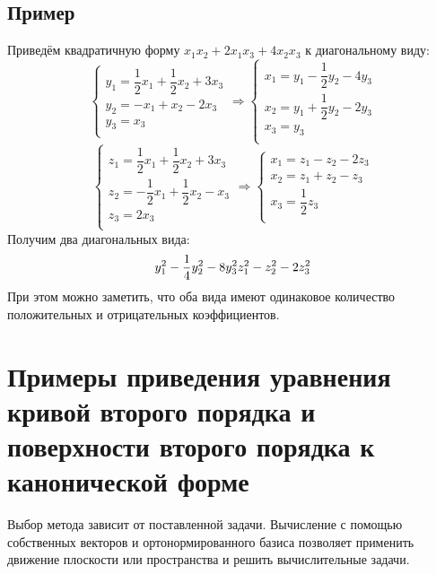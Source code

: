 \documentclass[12pt]{article}
\begin{document}
\subsection{Пример}
Приведём квадратичную форму $x_1x_2 + 2x_1x_3 + 4x_2x_3$ к диагональному виду:
\[
    \begin{cases}
        y_1 = \dfrac{1}{2}x_1 + \dfrac{1}{2}x_2 + 3x_3 \\
        y_2 = -x_1 + x_2 - 2x_3                        \\
        y_3 = x_3                                      \\
    \end{cases} \Rightarrow
    \begin{cases}
        x_1 = y_1 - \dfrac{1}{2}y_2 - 4y_3 \\
        x_2 = y_1 + \dfrac{1}{2}y_2 - 2y_3 \\
        x_3 = y_3                          \\
    \end{cases}
\]
\[
    \begin{cases}
        z_1 = \dfrac{1}{2}x_1 + \dfrac{1}{2}x_2 + 3x_3 \\
        z_2 = -\dfrac{1}{2}x_1 + \dfrac{1}{2}x_2 - x_3 \\
        z_3 = 2x_3                                     \\
    \end{cases} \Rightarrow
    \begin{cases}
        x_1 = z_1 - z_2 - 2z_3 \\
        x_2 = z_1 + z_2 - z_3  \\
        x_3 = \dfrac{1}{2}z_3  \\
    \end{cases}
\]
Получим два диагональных вида:
\[
    y_1^2 - \dfrac{1}{4}y_2^2 - 8y_3^2 \\ z_1^2 - z_2^2 - 2z_3^2
\]
При этом можно заметить, что оба вида имеют одинаковое количество положительных и отрицательных коэффициентов.

\section{Примеры приведения уравнения кривой второго порядка и поверхности второго порядка к канонической форме}
Выбор метода зависит от поставленной задачи. Вычисление с помощью собственных векторов и ортонормированного базиса позволяет применить движение плоскости или пространства и решить вычислительные задачи.
\end{document}
